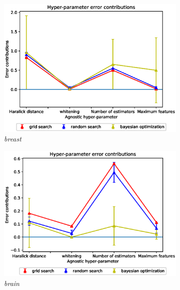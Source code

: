 \begin{figure}[ht!]
\centering
\begin{subfigure}{.5\textwidth}
  \centering
  \includegraphics[scale=0.37]{img/EP/agnostic_error_hyper_breast.eps}
  \caption{\textit{breast}}
  \label{fig:eq_hyper_breast}
\end{subfigure}%
\begin{subfigure}{.5\textwidth}
  \centering
  \includegraphics[scale=0.37]{img/EP/agnostic_error_hyper_brain.eps}
  \caption{\textit{brain}}
  \label{fig:eq_hyper_brain}
\end{subfigure}
\begin{subfigure}{.5\textwidth}
  \centering

\end{subfigure}
\end{figure}
